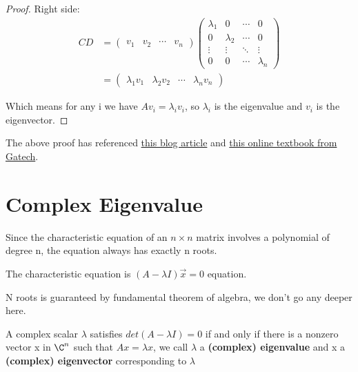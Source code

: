 \begin{proof}
   Right side:
   \begin{align*}
   CD & =  \begin{pmatrix}
             v_1 & v_2 & \cdots & v_n
           \end{pmatrix}
           \begin{pmatrix}
             \lambda_1 & 0 & \cdots & 0  \\  
             0 & \lambda_2 & \cdots & 0 \\
             \vdots & \vdots & \ddots & \vdots \\
             0 & 0 & \cdots & \lambda_n 
           \end{pmatrix} \\
        & = \begin{pmatrix}
           \lambda_1 v_1 & \lambda_2 v_2 & \cdots & \lambda_n v_n 
        \end{pmatrix}
   \end{align*}

   Which means for any i we have $Av_i = \lambda_i v_i$, so $\lambda_i$ is the eigenvalue and $v_i$  is the eigenvector.
\end{proof}

The above proof has referenced \href{https://leimao.github.io/blog/Matrix-Diagonalization-Theorem/}{this blog article} and \href{https://textbooks.math.gatech.edu/ila/diagonalization.html}{this online textbook from Gatech}.

\section{Complex Eigenvalue}

Since the characteristic equation of an \(n \times n\) matrix involves a polynomial of degree n, the equation always has exactly n roots.  

\begin{note}
    The characteristic equation is \((A - \lambda I) \vec{x}  = 0\) equation.

    N roots is guaranteed by fundamental theorem of algebra, we don't go any deeper here.
\end{note}

\begin{definition}
    A complex scalar \(\lambda\)  satisfies \(det(A - \lambda I) = 0\) if and only if there is a nonzero vector x in \(\C^n\) such that \(Ax = \lambda x\), we call \(\lambda\) a \textbf{(complex) eigenvalue} and x a \textbf{(complex) eigenvector} corresponding to \(\lambda\)     
\end{definition}

